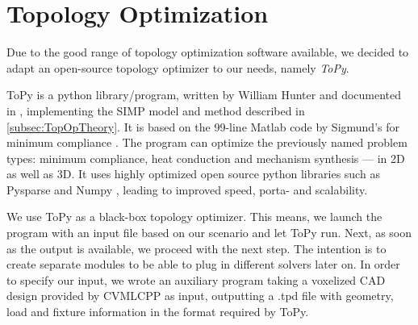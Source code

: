 \section{Topology Optimization}
\label{sec:ToPy}
Due to the good range of topology optimization software available, we decided to adapt an open-source topology optimizer to our needs, namely \emph{ToPy}.


ToPy \cite{ToPy} is a python library/program, written by William Hunter and documented in \cite{Hunter2009}, implementing the SIMP model and method described in \autoref{subsec:TopOpTheory}. It is based on the 99-line Matlab code by Sigmund's for minimum compliance \cite{sigmund200199}. The program can optimize the previously named problem types: minimum compliance, heat conduction and mechanism synthesis --- in 2D as well as 3D. It uses highly optimized open source python libraries such as Pysparse \cite{Pysparse} and Numpy \cite{Numpy}, leading to improved speed, porta- and scalability. %


We use ToPy as a black-box topology optimizer. This means, we launch the program with an input file based on our scenario and let ToPy run. Next, as soon as the output is available, we proceed with the next step. The intention is to create separate modules to be able to plug in different solvers later on. In order to specify our input, we wrote an auxiliary program taking a voxelized CAD design provided by CVMLCPP as input, outputting a .tpd file with geometry, load and fixture information in the format required by ToPy. 

